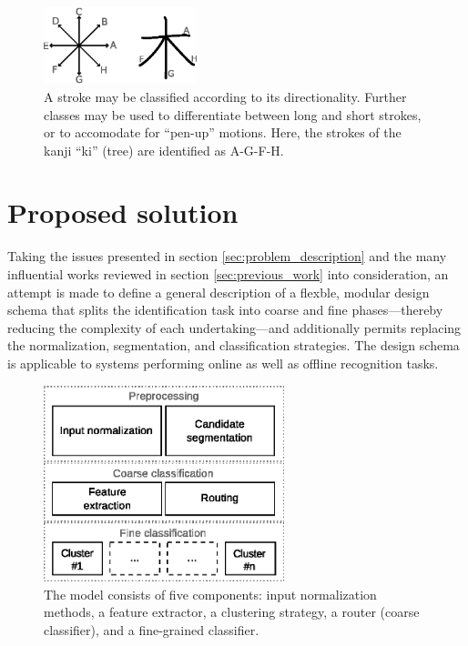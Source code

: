 \documentclass[10pt,conference,a4paper]{IEEEtran}
\begin{document}
	\begin{figure}
		\centering
		\includegraphics[width=1.75in]{./fig/stroke-categories.eps}
		\caption{A stroke may be classified according to its directionality.
			Further classes may be used to differentiate between long and short strokes,
		or to accomodate for ``pen-up'' motions. Here, the strokes of the kanji ``ki'' (tree) are identified as A-G-F-H.}
		\label{fig_stroke_categories}
	\end{figure}



	\section{Proposed solution}
	\label{sec:proposed_solution}

	Taking the issues presented in section \ref{sec:problem_description} and the many influential works reviewed in section \ref{sec:previous_work}
	into consideration, an attempt is made to define a general description of a flexble, modular 
	design schema that splits the identification task into coarse and fine phases---thereby reducing the complexity of each undertaking---and 
	additionally permits replacing the normalization, segmentation, and classification strategies. %
	The design schema is applicable to systems performing online as well as offline recognition tasks.

	\begin{figure}[b]
		\centering
		\includegraphics[width=2.75in]{./fig/model-overview.eps}
		\caption{The model consists of five components: input normalization methods, a feature extractor,
			a clustering strategy, a router (coarse classifier), and a fine-grained classifier.}
		\label{fig_model_overview}
	\end{figure}
\end{document}

